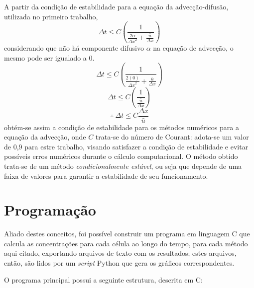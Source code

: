 A partir da condição de estabilidade para a equação da advecção-difusão,
utilizada no primeiro trabalho,
\begin{equation}
    \Delta t
    \leq
    C\left(
        \frac{1}{\frac{2\alpha}{{\Delta x}^2} + \frac{\bar{u}}{\Delta x}}
    \right)
\end{equation}
considerando que não há componente difusivo $\alpha$ na equação de advecção, o
mesmo pode ser igualado a 0.
\[
    \Delta t
    \leq
    C\left(
        \frac{1}{\frac{2(0)}{{\Delta x}^2} + \frac{\bar{u}}{\Delta x}}
    \right)
\]
\[
    \Delta t \leq C\left( \frac{1}{\frac{\bar{u}}{\Delta x}} \right)
\]
\begin{equation}
    \therefore\ \Delta t \leq C\frac{\Delta x}{\bar{u}}
\end{equation}
obtém-se assim a condição de estabilidade para os métodos numéricos para a
equação da advecção, onde $C$ trata-se do número de Courant: adota-se um valor
de 0,9 para estre trabalho, visando satisfazer a condição de estabilidade e
evitar possíveis erros numéricos durante o cálculo computacional. O método
obtido trata-se de um método \emph{condicionalmente estável}, ou seja que
depende de uma faixa de valores para garantir a estabilidade de seu
funcionamento.

\section{Programação}
Aliado destes conceitos, foi possível construir um programa em linguagem C que
calcula as concentrações para cada célula ao longo do tempo, para cada método
aqui citado, exportando arquivos de texto com os resultados; estes arquivos,
então, são lidos por um \textit{script} Python que gera os gráficos
correspondentes.

O programa principal possui a seguinte estrutura, descrita em C:

